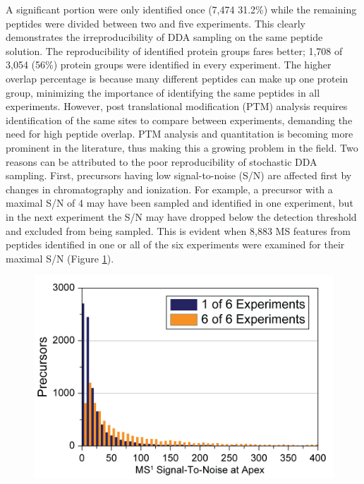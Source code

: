 A significant portion were only identified once (7,474 31.2\%) while the remaining peptides were divided between two and five experiments. This clearly demonstrates the irreproducibility of DDA sampling on the same peptide solution. The reproducibility of identified protein groups fares better; 1,708 of 3,054 (56\%) protein groups were identified in every experiment. The higher overlap percentage is because many different peptides can make up one protein group, minimizing the importance of identifying the same peptides in all experiments. However, post translational modification (PTM) analysis requires identification of the same sites to compare between experiments, demanding the need for high peptide overlap. PTM analysis and quantitation is becoming more prominent in the literature, thus making this a growing problem in the field. Two reasons can be attributed to the poor reproducibility of stochastic DDA sampling. First, precursors having low signal-to-noise (S/N) are affected first by changes in chromatography and ionization. For example, a precursor with a maximal S/N of 4 may have been sampled and identified in one experiment, but in the next experiment the S/N may have dropped below the detection threshold and excluded from being sampled. This is evident when 8,883 MS features from peptides identified in one or all of the six experiments were examined for their maximal S/N (Figure \ref{fig:eoas1}).
 \begin{figure}
 	\centering
 	\includegraphics[width=0.9\columnwidth]{eoa/EOA S1.png}
 	\label{fig:eoas1}
 \end{figure}
